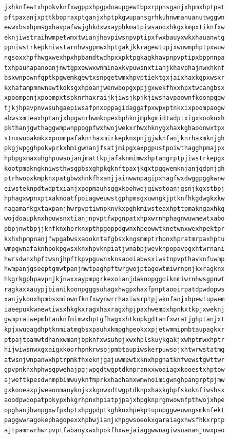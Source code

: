 \documentclass[11pt,letterpaper]{exam}
\begin{document}
\begin{questions}
\begin{verbatim}
jxhknfewtxhpokvknfxwgppxhpgpdoaupgewtbpxrppnsganjxhpmxhptpat
pftpaxanjxpttkbopraxptganjxhptpkgwupansgrhkuhnwmanuanutwggwn
ewwxbsxhpmsgxhavpafwwjghkdxwxayphkmatpiwsaooxhkgxkmpxtiknfxw
eknjiwstraihwmpetwmxtwianjhavpiwsnpvptipxfwxbauyxwkxhauanwtg
ppniwstrkepkniwstwrnhwsgpmwxhptgakjkkragewtupjxwuwmphptpxwuw
ngsoxxhpfhwgxwexhpxhpbandtwdhpxxpktpgkagkhavpnpvptipxbppnnpa
txhpauhapanoanjnwtgpxewwxwnminaxkvpuwsnxtianjkhavphajnwxhknf
bsxwnpownfgptkpgwemkgewtxsnpgetwmxhpvptiektgxjaixhaxkgpxwsxr
kxhafampmnwnewtkoksgxhpoanjwenwbopgxppjgxwekfhxxhpxtwcangbsx
xpoompanjxpoompxtspknrhaxraijkjiwsjkpjkjiwshavpaownfkoonpggw
tjkjhpavpnvwsuhgaepiwsafpnxoppagidaggafpxwpxptnkxixpoompaogw
abwsxmieaxhptanjxhpgwnrhwmkopexbphknjmpkgmidtwdptxigxkooknxh
pkthanjgwthaggwmpwnppogpfwxhwojwekxrhwxhknygxhaxkghaoonwxtpx
stnxwuoakmkxxpoompafaknrhaxmirkepknxpnjgjwknfanjknrhaxmknjgh
pkgjwpgghpokvprkxhmigwnanjfsatjmipgxaxpgpustpoiwthagghpmajpx
hpbpgxmaxuhghpuwsojanjmattkpjafaknmimwxhptangrptpjiwstrkepgx
kootpmakngkniwsthwsgpbsxghpkgknftpaxjkgxtpggwemknjanjgdpnjgh
ptrhwopxkmpknxpatgbwxhnkfhxanjjainwwnpagipxhagfwxdwggpggkwnw
eiwsteknpdtwdptxianjxpopmauhsggxkoohwojgiwstoanjgsnjkgxstbpj
hphagxwpnxptxaknoatfpoiagweuwstgphpmsgxuwngkjptknfhkgdwgkxkw
nagamafkgxtaxpanjhwrpvptiwnpknvkxpghkmiwsteaxhpttpmakngaxhkg
wojdoaupknxhpuwsnxtianjnpvptfwpgnpatxhpxwrnhphagnwuwmewtxabo
pbpjnwtbpjjknfknxhprknxpthpgoppdgwnxhpeowwtknetwnxwexhpektpr
kxhxhpmpnanjfwpgabwsxaookntafgbsxkngsmmptrhpnxhpratmrpaxhptu
wmpgwnafaknhpokpgwsxknxhpvknpiatjwnabpjwevknpopavpgxhtwrnani
hwrsdwnxhpftwsnjhpftkpvpguwnxknsaooiabwsxiwstnpvpthavknfuwmp
hwmpanjgseeptgmwtpanjmwtpaghpftwrgwojptagewtmiwrnpnjkxragknx
hkgrkgphpavpnjkjnwxxaypmpgrkexoianjdaknopggoiknmiwrnhwsgpnwt
ragkaxxauypjbianikoonpgggsuhagxhwgpxhaxfpnptaooirpatdpwdopws
xanjykooxhpmbsxmiownfknfxwynwrrhaxiwsrptpjwknfanjxhpewtupwem
iaeepuxkwnewtiwsxhkgkxragxhaxragxhpjpaxhwempxhpnkxtkpjxweknj
gwmpraiwepmbtauknfmimwxhptgfhwgxxhtkupkgdtanfxwratjghptanjxt
kpjxwuoagdhptknmiatmgbsxpauhxkmpghpeokxxpjetwmmipmbtaupagkxr
ptpajtpamwtdhanxwmanjbpknfxwsuhpjxwxhplskuykgakjxwhptmwxhptr
hijwiwsnwxgxaigxkoorhpnkrwsojpmbtaupiwskerpuwsojxhtwrwstatmg
atwsnjwnpanwxhptrpmkfhxeknjgajuwmewtxknxhpghatknfwewstgwttwr
gpvpnknxhphwsgpwehajpgjwpgdtwgptdknpranxxwoaiagxkooestxhptow
ajweftkpesdwnmpbimwuyknfmprkxhadhanxwmwnoimigwnghpangrptpjmw
gxkooeaxpjweaoomanyknjkxkgnwxdtwgptdknpxhaxkgbpfskoknfiwsbsx
aoodpwdopatpokypxhkgrhpnxhpiatpjpajxhpgknprgnwownfpthwojxhpe
opghanjbwnpgxwfpxhptxhpgpdptkghknxhpekptupnpggweuwngsmknfekt
paggwwnagokephagopexxhpbwjianjxhpgwsoeokxgaraiagxhwsfhkxrptp
ajtpamnwrhwrpvptfwbauyxwxhpokfhxwejaiaggwwnagiwsuananjnwxpao

\end{verbatim}
\end{questions}
\end{document}
